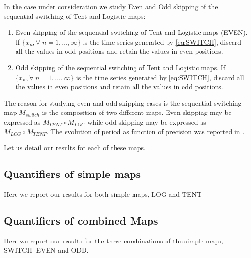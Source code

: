 In the case under consideration we study Even and Odd skipping of the sequential switching of Tent and Logistic maps:
\begin{enumerate}
	\item Even skipping of the sequential switching of Tent and Logistic maps (EVEN).\\
	If $\{x_n,\forall \; n=1,\dots,\infty\}$ is the time series generated by \ref{eq:SWITCH}, discard all the values in odd positions and retain the values in even positions.
	\item Odd skipping of the sequential switching of Tent and Logistic maps.
	If $\{x_n, \forall \; n=1,\dots,\infty\}$ is the time series generated by \ref{eq:SWITCH}, discard all the values in even positions and retain all the values in odd positions.
\end{enumerate}

The reason for studying even and odd skipping cases is the sequential switching map $M_{switch}$ is the composition of two different maps.
Even skipping may be expressed as $M_{TENT}\circ M_{LOG}$ while odd skipping may be expressed as $M_{LOG} \circ M_{TENT}$.
The evolution of period as function of precision was reported in \cite{Nagaraj2008}.

Let us detail our results for each of these maps.



\subsection {Quantifiers of simple maps}\label{subsec:SimpleMaps}
Here we report our results for both simple maps, LOG and TENT



 

\subsection{Quantifiers of combined Maps}\label{subsec:SecSwitch}
Here we report our results for the three combinations of the simple maps, SWITCH, EVEN and ODD.



